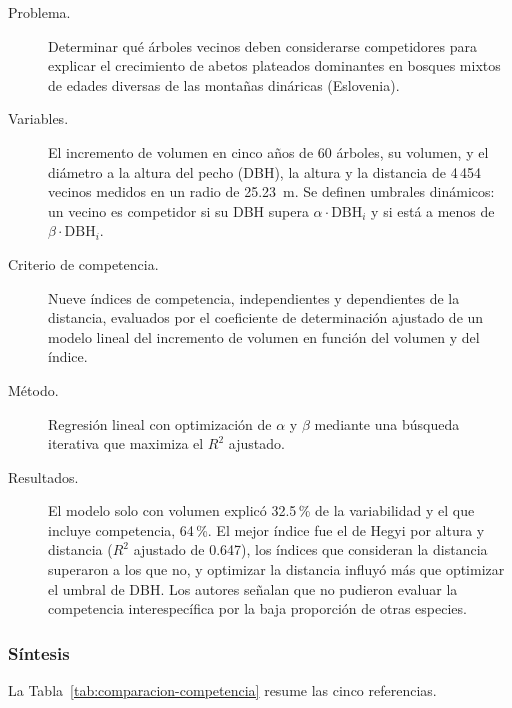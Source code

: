 \documentclass[11pt]{article}
\begin{document}
\begin{description}
  \item[Problema.] Determinar qué árboles vecinos deben considerarse competidores para explicar el crecimiento de abetos plateados dominantes en bosques mixtos de edades diversas de las montañas dináricas (Eslovenia).
  \item[Variables.] El incremento de volumen en cinco años de 60 árboles, su volumen, y el diámetro a la altura del pecho (DBH), la altura y la distancia de 4\,454 vecinos medidos en un radio de 25.23~m. Se definen umbrales dinámicos: un vecino es competidor si su DBH supera $\alpha\cdot\mathrm{DBH}_i$ y si está a menos de $\beta\cdot\mathrm{DBH}_i$.
  \item[Criterio de competencia.] Nueve índices de competencia, independientes y dependientes de la distancia, evaluados por el coeficiente de determinación ajustado de un modelo lineal del incremento de volumen en función del volumen y del índice.
  \item[Método.] Regresión lineal con optimización de $\alpha$ y $\beta$ mediante una búsqueda iterativa que maximiza el $R^{2}$ ajustado.
  \item[Resultados.] El modelo solo con volumen explicó 32.5\,\% de la variabilidad y el que incluye competencia, 64\,\%. El mejor índice fue el de Hegyi por altura y distancia ($R^{2}$ ajustado de 0.647), los índices que consideran la distancia superaron a los que no, y optimizar la distancia influyó más que optimizar el umbral de DBH. Los autores señalan que no pudieron evaluar la competencia interespecífica por la baja proporción de otras especies.
\end{description}

\subsubsection{Síntesis}

La Tabla~\ref{tab:comparacion-competencia} resume las cinco referencias.
\end{document}
